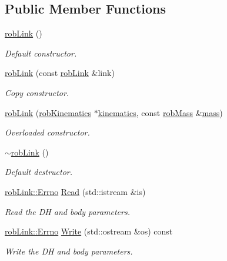 \subsection*{Public Member Functions}
\begin{DoxyCompactItemize}
\item 
\hyperlink{classrob_link_a5c9bf326ac6a5cdbb3d81298542d8b2a}{rob\-Link} ()
\begin{DoxyCompactList}\small\item\em Default constructor. \end{DoxyCompactList}\item 
\hyperlink{classrob_link_af121e250141aed290d0032ca9ede0b97}{rob\-Link} (const \hyperlink{classrob_link}{rob\-Link} \&link)
\begin{DoxyCompactList}\small\item\em Copy constructor. \end{DoxyCompactList}\item 
\hyperlink{classrob_link_a7ab7ea35f349edacca6168040b2bd5a9}{rob\-Link} (\hyperlink{classrob_kinematics}{rob\-Kinematics} $\ast$\hyperlink{classrob_link_a4aa26f90307b406c336f9b7fae00b905}{kinematics}, const \hyperlink{classrob_mass}{rob\-Mass} \&\hyperlink{classrob_link_a7b524ebf9d101bc369749585db1ba66d}{mass})
\begin{DoxyCompactList}\small\item\em Overloaded constructor. \end{DoxyCompactList}\item 
\hyperlink{classrob_link_accaf7612af8696ae8188013b4acfcd9a}{$\sim$rob\-Link} ()
\begin{DoxyCompactList}\small\item\em Default destructor. \end{DoxyCompactList}\item 
\hyperlink{classrob_link_aeafaa7aaa6cb47af0db3b746606c0bd0}{rob\-Link\-::\-Errno} \hyperlink{classrob_link_a9b3945e5c8efca7c331a6d9f560ec4ff}{Read} (std\-::istream \&is)
\begin{DoxyCompactList}\small\item\em Read the D\-H and body parameters. \end{DoxyCompactList}\item 
\hyperlink{classrob_link_aeafaa7aaa6cb47af0db3b746606c0bd0}{rob\-Link\-::\-Errno} \hyperlink{classrob_link_afb16c58fe303d6aaeab579b86f65c00b}{Write} (std\-::ostream \&os) const 
\begin{DoxyCompactList}\small\item\em Write the D\-H and body parameters. \end{DoxyCompactList}\item 

\end{DoxyCompactItemize}
